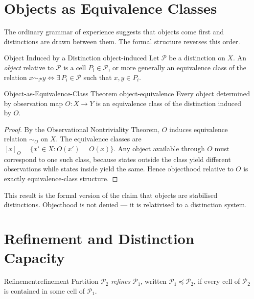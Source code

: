 \documentclass[12pt,twoside,openright]{book}
\newcommand{\partition}{\mathcal{P}}
\begin{document}
\section{Objects as Equivalence Classes}
\label{sec:ch1-objects}

The ordinary grammar of experience suggests that objects
come first and distinctions are drawn between them. The
formal structure reverses this order.

\begin{definition}{Object Induced by a Distinction}%
  {object-induced}
  Let $\partition$ be a distinction on $X$.
  An \emph{object} relative to $\partition$ is a cell
  $P_i \in \partition$, or more generally an equivalence
  class of the relation
  $x \sim_\partition y \iff \exists\, P_i \in \partition$
  such that $x, y \in P_i$.
\end{definition}

\begin{theorem}{Object-as-Equivalence-Class Theorem}%
  {object-equivalence}
  Every object determined by observation map $O: X \to Y$
  is an equivalence class of the distinction induced by $O$.
\end{theorem}

\begin{proof}
  By the Observational Nontriviality Theorem, $O$ induces
  equivalence relation $\sim_O$ on $X$. The equivalence
  classes are $[x]_O = \{x' \in X : O(x') = O(x)\}$.
  Any object available through $O$ must correspond to one
  such class, because states outside the class yield
  different observations while states inside yield the
  same. Hence objecthood relative to $O$ is exactly
  equivalence-class structure.
\end{proof}

This result is the formal version of the claim that
objects are stabilised distinctions. Objecthood is not
denied — it is relativised to a distinction system.

\section{Refinement and Distinction Capacity}
\label{sec:ch1-refinement}

\begin{definition}{Refinement}{refinement}
  Partition $\partition_2$ \emph{refines} $\partition_1$,
  written $\partition_1 \preceq \partition_2$, if every
  cell of $\partition_2$ is contained in some cell of
  $\partition_1$. 
\end{definition}
\end{document}
